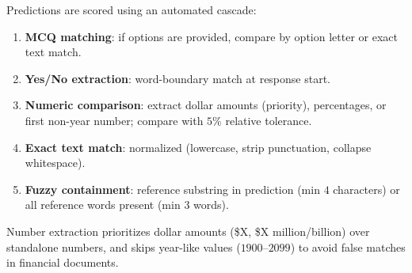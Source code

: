 Predictions are scored using an automated cascade:
\begin{enumerate}
    \item \textbf{MCQ matching}: if options are provided, compare by
      option letter or exact text match.
    \item \textbf{Yes/No extraction}: word-boundary match at response
      start.
    \item \textbf{Numeric comparison}: extract dollar amounts
      (priority), percentages, or first non-year number; compare with
      $5\%$ relative tolerance.
    \item \textbf{Exact text match}: normalized (lowercase, strip
      punctuation, collapse whitespace).
    \item \textbf{Fuzzy containment}: reference substring in
      prediction (min $4$ characters) or all reference words present
      (min $3$ words).
\end{enumerate}

Number extraction prioritizes dollar amounts (\$X, \$X
million/billion) over standalone numbers, and skips year-like values
($1900$--$2099$) to avoid false matches in financial documents.

